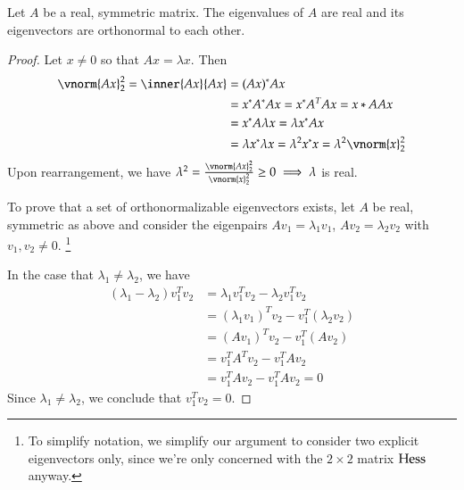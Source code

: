         \begin{lemma}
		Let $A$ be a real, symmetric matrix. The eigenvalues of $A$ are real and its eigenvectors are orthonormal to each other.
	\end{lemma}
	
	\begin{proof}
		Let $x\ne 0$ so that $Ax = \lambda x$. Then 
		\begin{align*}
		\vnorm{Ax}_2^2 = \inner{Ax}{Ax}  &= (Ax)^{*} Ax \\
						&= x^{*}A^{*}Ax = x^{*}A^T A x = x*A A x \\
						&= x^{*} A \lambda x = \lambda x^{*} A x \\
						&= \lambda x^{*} \lambda x = \lambda^2 x^{*} x = \lambda ^2 \vnorm{x}_2^2
		\end{align*}
		Upon rearrangement, we have
		$\lambda^2 = \frac{\vnorm{Ax}_2^2}{\vnorm{x}_2^2} \ge 0 \implies \lambda $ is real.
		
		To prove that a set of orthonormalizable eigenvectors exists,
		let $A$ be real, symmetric as above and consider the eigenpairs
		$Av_1 = \lambda_1 v_1$, $Av_2 = \lambda_2 v_2$ with $v_1, v_2 \ne 0$.
		\footnote{To simplify notation, we simplify our argument to consider two explicit eigenvectors only, since we're only concerned with the $2\times 2$ matrix $\mathrm{Hess}$
			anyway.}
		
		In the case that $\lambda_1 \ne \lambda_2$, we have
		\begin{align*}
			(\lambda_1 - \lambda_2)v_1^T v_2 &= \lambda_1 v_1^T v_2 - \lambda_2 v_1^T v_2 \\
										  	 &= (\lambda_1 v_1)^T v_2 - v_1^T (\lambda_2 v_2) \\
										  	 &= (Av_1)^T v_2 - v_1^T (Av_2) \\
										  	 &= v_1^T A^T v_2 - v_1^T A v_2 \\
										  	 &= v_1^T A v_2 - v_1^T A v_2 = 0
			\end{align*}
			Since $\lambda_1 \ne \lambda_2$, we conclude that $v_1^T v_2 = 0$.
		

\end{proof}
